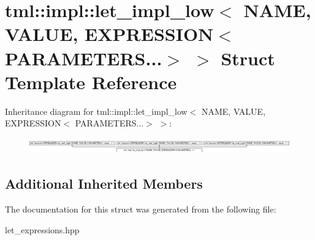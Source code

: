\hypertarget{structtml_1_1impl_1_1let__impl__low_3_01NAME_00_01VALUE_00_01EXPRESSION_3_01PARAMETERS_8_8_8_4_01_4}{\section{tml\+:\+:impl\+:\+:let\+\_\+impl\+\_\+low$<$ N\+A\+M\+E, V\+A\+L\+U\+E, E\+X\+P\+R\+E\+S\+S\+I\+O\+N$<$ P\+A\+R\+A\+M\+E\+T\+E\+R\+S...$>$ $>$ Struct Template Reference}
\label{structtml_1_1impl_1_1let__impl__low_3_01NAME_00_01VALUE_00_01EXPRESSION_3_01PARAMETERS_8_8_8_4_01_4}
}
Inheritance diagram for tml\+:\+:impl\+:\+:let\+\_\+impl\+\_\+low$<$ N\+A\+M\+E, V\+A\+L\+U\+E, E\+X\+P\+R\+E\+S\+S\+I\+O\+N$<$ P\+A\+R\+A\+M\+E\+T\+E\+R\+S...$>$ $>$\+:\begin{figure}[H]
\begin{center}
\leavevmode
\includegraphics[height=0.699126cm]{structtml_1_1impl_1_1let__impl__low_3_01NAME_00_01VALUE_00_01EXPRESSION_3_01PARAMETERS_8_8_8_4_01_4}
\end{center}
\end{figure}
\subsection*{Additional Inherited Members}


The documentation for this struct was generated from the following file\+:\begin{DoxyCompactItemize}
\item 
let\+\_\+expressions.\+hpp\end{DoxyCompactItemize}
